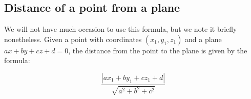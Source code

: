 \documentclass[10pt]{amsart}
\begin{document}
\subsection{Distance of a point from a plane}

We will not have much occasion to use this formula, but we note it
briefly nonetheless. Given a point with coordinates $(x_1,y_1,z_1)$
and a plane $ax + by + cz + d = 0$, the distance from the point to the
plane is given by the formula:

$$\frac{|ax_1 + by_1 + cz_1 + d|}{\sqrt{a^2 + b^2 + c^2}}$$
\end{document}
